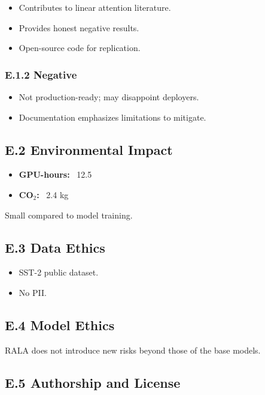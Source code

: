 \begin{itemize}
\item Contributes to linear attention literature.
\item Provides honest negative results.
\item Open-source code for replication.

\end{itemize}
\subsubsection{E.1.2 Negative}

\begin{itemize}
\item Not production-ready; may disappoint deployers.
\item Documentation emphasizes limitations to mitigate.

\end{itemize}
\subsection{E.2 Environmental Impact}

\begin{itemize}
\item \textbf{GPU-hours:} ~12.5
\item \textbf{CO$_2$:} ~2.4 kg

\end{itemize}
Small compared to model training.

\subsection{E.3 Data Ethics}

\begin{itemize}
\item SST-2 public dataset.
\item No PII.

\end{itemize}
\subsection{E.4 Model Ethics}

RALA does not introduce new risks beyond those of the base models.

\subsection{E.5 Authorship and License}

